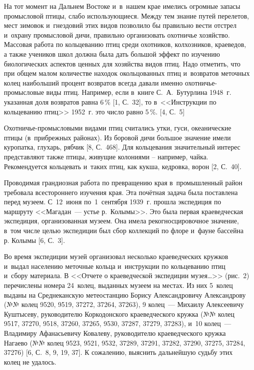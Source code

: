 На тот момент на Дальнем Востоке и~в~нашем крае имелись огромные запасы промысловой птицы, слабо использующиеся. Между тем знание путей перелетов, мест зимовок и~гнездовий этих видов позволило бы правильно вести отстрел и~охрану промысловой дичи, правильно организовать охотничье хозяйство. Массовая работа по кольцеванию птиц среди охотников, колхозников, краеведов, а также учеников школ должна была дать большой эффект по изучению биологических аспектов ценных для хозяйства видов птиц. Надо отметить, что при общем малом количестве находок окольцованных птиц и~возвратов меточных колец наибольший процент возвратов всегда давали именно охотничье-промысловые виды птиц. Например, если в~книге С.~А.~Бутурлина 1948~г. указанная доля возвратов равна 6\,\% [1, С.~32], то в~<<Инструкции по кольцеванию птиц>> 1952~г. это число равно 5\,\%.  [4, С.~5]

Охотничье-промысловыми видами птиц считались утки, гуси, океанические птицы (в~прибрежных районах). Из боровой дичи большое значение имели куропатка, глухарь, рябчик [8, С.~468]. Для кольцевания значительный интерес представляют также птицы, живущие колониями – например, чайка. Рекомендуется кольцевать и~таких птиц, как кукша, кедровка, ворон [2, С.~40].

Проводимая грандиозная работа по превращению края в~промышленный район требовала всестороннего изучения края. Эта почётная задача была поставлена перед музеем. С~12~июня по~1~сентября 1939~г. прошла экспедиция по маршруту <<Магадан~--- устье р.~Колымы>>. Это была первая краеведческая экспедиция, организованная музеем. Она имела рекогносцировочное значение, в~том числе целью экспедиции был сбор коллекций по флоре и~фауне бассейна р. Колымы [6, С.~3].

Во время экспедиции музей организовал несколько краеведческих кружков и~выдал населению меточные кольца и~инструкции по кольцеванию птиц и~сбору материала. В <<Отчете о краеведческой экспедиции музея\dots>> (рис.~2) перечислены номера 24~колец, выданных музеем на местах. Из них 5~колец выданы на Среднеканскую метеостанцию Борису Александровичу Александрову (№№ колец 9520, 9519, 37272, 37264, 37263), 9 колец~--- Михаилу Алексеевичу Куштысеву, руководителю Коркодонского краеведческого кружка (№№ колец 9517, 37270, 9518, 37260, 37265, 9530, 37287, 37279, 37283), и~10 колец~--- Владимиру Афанасьевичу Ковалеву, руководителю краеведческого кружка Нагаево (№№ колец 9523, 9521, 9532, 37289, 37291, 37282, 37290, 37275, 37284, 37276) [6, С.~8, 9, 19, 37]. К сожалению, выяснить дальнейшую судьбу этих колец не удалось.

